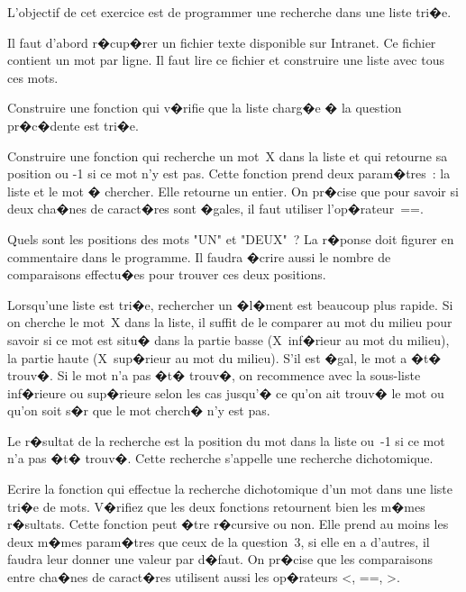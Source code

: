 %


\exosubject{}
\begin{xexercicenot}\label{td_note_label_2006}


L'objectif de cet exercice est de programmer une recherche dans une liste tri�e.

\exequest Il faut d'abord r�cup�rer un fichier texte disponible sur Intranet. Ce fichier contient un mot par ligne. Il faut lire ce fichier et construire une liste avec tous ces mots.

\exequest Construire une fonction qui v�rifie que la liste charg�e � la question pr�c�dente est tri�e.

\exequest Construire une fonction qui recherche un mot~X dans la liste et qui retourne sa position ou -1 si ce mot n'y est pas. Cette fonction prend deux param�tres~: la liste et le mot � chercher. Elle retourne un entier. On pr�cise que pour savoir si deux cha�nes de caract�res sont �gales, il faut utiliser l'op�rateur~==.

\exequest Quels sont les positions des mots "UN" et "DEUX"~? La r�ponse doit figurer en commentaire dans le programme. Il faudra �crire aussi le nombre de comparaisons effectu�es pour trouver ces deux positions.

\exequest Lorsqu'une liste est tri�e, rechercher un �l�ment est beaucoup plus rapide. Si on cherche le mot~X dans la liste, il suffit de le comparer au mot du milieu pour savoir si ce mot est situ� dans la partie basse (X~inf�rieur au mot du milieu), la partie haute (X~sup�rieur au mot du milieu). S'il est �gal, le mot a �t� trouv�. Si le mot n'a pas �t� trouv�, on recommence avec la sous-liste inf�rieure ou sup�rieure selon les cas jusqu'� ce qu'on ait trouv� le mot ou qu'on soit s�r que le mot cherch� n'y est pas.

Le r�sultat de la recherche est la position du mot dans la liste ou~-1 si ce mot n'a pas �t� trouv�. Cette recherche s'appelle une recherche dichotomique. 

Ecrire la fonction qui effectue la recherche dichotomique d'un mot dans une liste tri�e de mots. V�rifiez que les deux fonctions retournent bien les m�mes r�sultats. Cette fonction peut �tre r�cursive ou non. Elle prend au moins les deux m�mes param�tres que ceux de la question~3, si elle en a d'autres, il faudra leur donner une valeur par d�faut. On pr�cise que les comparaisons entre cha�nes de caract�res utilisent aussi les op�rateurs <, ==, >.


\end{xexercicenot}
